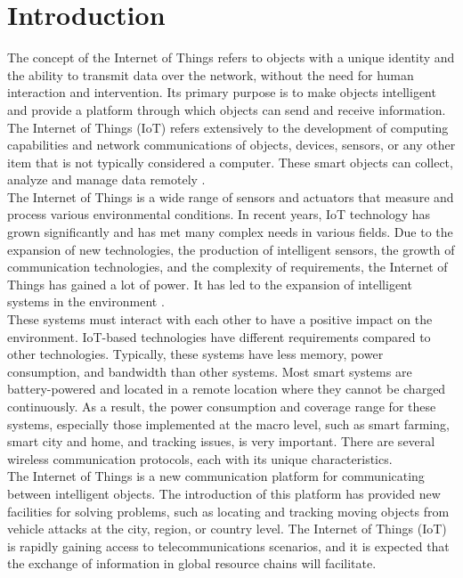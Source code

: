 \chapter{Introduction}
The concept of the Internet of Things refers to objects with a unique identity and the ability to transmit data over the network, without the need for human interaction and intervention. Its primary purpose is to make objects intelligent and provide a platform through which objects can send and receive information. The Internet of Things (IoT) refers extensively to the development of computing capabilities and network communications of objects, devices, sensors, or any other item that is not typically considered a computer.
These smart objects can collect, analyze and manage data remotely \cite{1}.\\
The Internet of Things is a wide range of sensors and actuators that measure and process various environmental conditions. In recent years, IoT technology has grown significantly and has met many complex needs in various fields. Due to the expansion of new technologies, the production of intelligent sensors, the growth of communication technologies, and the complexity of requirements, the Internet of Things has gained a lot of power. It has led to the expansion of intelligent systems in the environment \cite{2}.\\
These systems must interact with each other to have a positive impact on the environment. IoT-based technologies have different requirements compared to other technologies. Typically, these systems have less memory, power consumption, and bandwidth than other systems. Most smart systems are battery-powered and located in a remote location where they cannot be charged continuously. As a result, the power consumption and coverage range for these systems, especially those implemented at the macro level, such as smart farming, smart city and home, and tracking issues, is very important. There are several wireless communication protocols, each with its unique characteristics.\\
The Internet of Things is a new communication platform for communicating between intelligent objects. The introduction of this platform has provided new facilities for solving problems, such as locating and tracking moving objects from vehicle attacks at the city, region, or country level. The Internet of Things (IoT) is rapidly gaining access to telecommunications scenarios, and it is expected that the exchange of information in global resource chains will facilitate.\\
